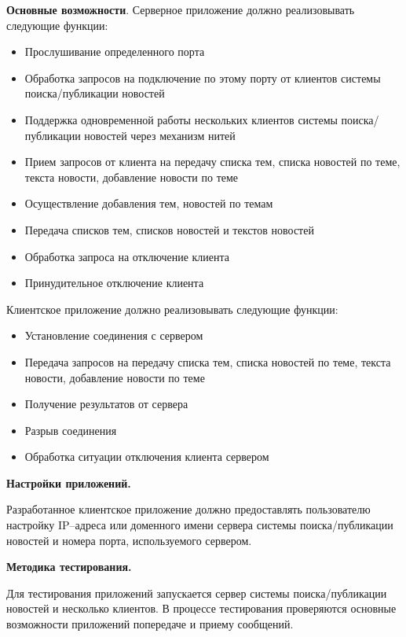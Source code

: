 \documentclass[a4paper]{article}
\begin{document}
\textbf{Основные возможности}. Серверное приложение должно реализовывать следующие функции:
\begin{itemize}
\item Прослушивание определенного порта
\item Обработка запросов на подключение по этому порту от клиентов
системы поиска/публикации новостей
\item Поддержка одновременной работы нескольких клиентов системы
поиска/публикации новостей через механизм нитей
\item Прием запросов от клиента на передачу списка тем, списка новостей
по теме, текста новости, добавление новости по теме
\item Осуществление добавления тем, новостей по темам
\item Передача списков тем, списков новостей и текстов новостей
\item Обработка запроса на отключение клиента
\item Принудительное отключение клиента
\end{itemize}

Клиентское приложение должно реализовывать следующие функции:
\begin{itemize}
\item Установление соединения с сервером
\item Передача запросов на передачу списка тем, списка новостей по теме,
текста новости, добавление новости по теме
\item Получение результатов от сервера
\item Разрыв соединения
\item Обработка ситуации отключения клиента сервером
\end{itemize}

\textbf{Настройки приложений.}

Разработанное клиентское приложение должно предоставлять пользователю настройку IP–адреса или доменного имени сервера системы поиска/публикации новостей и номера порта, используемого сервером.

\textbf{Методика тестирования.}

Для тестирования приложений запускается
сервер системы поиска/публикации новостей и несколько клиентов. В процессе тестирования проверяются основные возможности приложений попередаче и приему сообщений.
\end{document}
